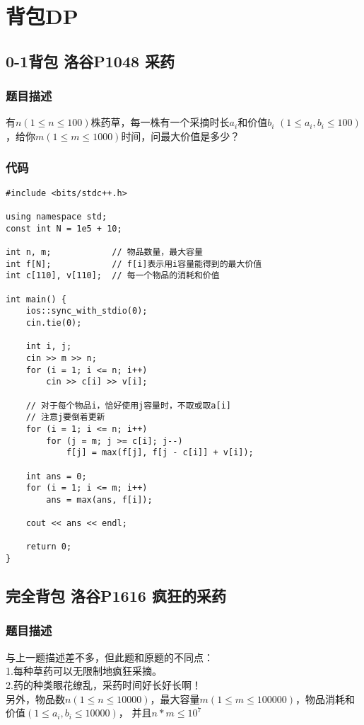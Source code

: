 \section{背包DP}

\subsection{0-1背包 洛谷P1048 采药}
    \subsubsection{题目描述}
        有$n (1\le n\le 100)$株药草，每一株有一个采摘时长$a_i$和价值$b_i$ $(1\le a_i,b_i\le 100)$，给你$m (1\le m\le 1000)$时间，问最大价值是多少？
    \subsubsection{代码}
\begin{lstlisting}
#include <bits/stdc++.h>

using namespace std;
const int N = 1e5 + 10;

int n, m;            // 物品数量，最大容量
int f[N];            // f[i]表示用i容量能得到的最大价值
int c[110], v[110];  // 每一个物品的消耗和价值

int main() {
    ios::sync_with_stdio(0);
    cin.tie(0);

    int i, j;
    cin >> m >> n;
    for (i = 1; i <= n; i++)
        cin >> c[i] >> v[i];

    // 对于每个物品i，恰好使用j容量时，不取或取a[i]
    // 注意j要倒着更新
    for (i = 1; i <= n; i++)
        for (j = m; j >= c[i]; j--)
            f[j] = max(f[j], f[j - c[i]] + v[i]);

    int ans = 0;
    for (i = 1; i <= m; i++)
        ans = max(ans, f[i]);

    cout << ans << endl;

    return 0;
}
\end{lstlisting}

\subsection{完全背包 洛谷P1616 疯狂的采药}
    \subsubsection{题目描述}
        与上一题描述差不多，但此题和原题的不同点：\\
        1.每种草药可以无限制地疯狂采摘。\\
        2.药的种类眼花缭乱，采药时间好长好长啊！\\
        另外，物品数$n (1\le n\le 10000)$，最大容量$m (1\le m\le 100000)$，物品消耗和价值$(1\le a_i,b_i\le 10000)$，
        并且$n*m\le 10^7$
